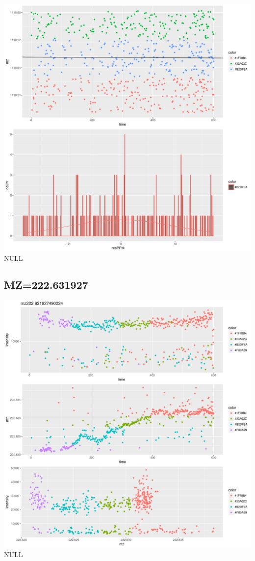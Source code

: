\documentclass[]{article}
\begin{document}
\includegraphics{Supplementary_document_files/figure-latex/filter.lm.1110-1.pdf}
NULL

\subsection{MZ=222.631927}\label{mz222.631927}

\includegraphics{Supplementary_document_files/figure-latex/cluster.mz.222-1.pdf}
NULL
\end{document}
